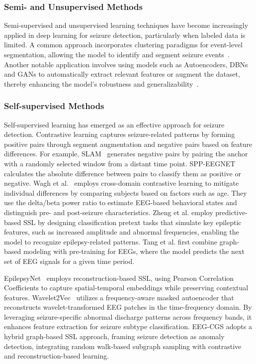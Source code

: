 \subsubsection{Semi- and Unsupervised Methods}
Semi-supervised and unsupervised learning techniques have become increasingly applied in deep learning for seizure detection, particularly when labeled data is limited. 
A common approach incorporates clustering paradigms for event-level segmentation, allowing the model to identify and segment seizure events~\cite{Zhan2020EpilepsyDetection}.
Another notable application involves using models such as Autoencoders, DBNs and GANs to automatically extract relevant features or augment the dataset, thereby enhancing the model’s robustness and generalizability~\cite{abdelhameed2018epileptic,turner2014deep,you2020unsupervised}. 


\subsubsection{Self-supervised Methods}
Self-supervised learning has emerged as an effective approach for seizure detection. 
Contrastive learning captures seizure-related patterns by forming positive pairs through segment augmentation and negative pairs based on feature differences.
For example, SLAM~\cite{XIAO2024105464} generates negative pairs by pairing the anchor with a randomly selected window from a distant time point. SPP-EEGNET~\cite{li2022spp} calculates the absolute difference between pairs to classify them as positive or negative.
Wagh et al.~\cite{wagh2021domain} employs cross-domain contrastive learning to mitigate individual differences by comparing subjects based on factors such as age. They use the delta/beta power ratio to estimate EEG-based behavioral states and distinguish pre- and post-seizure characteristics.
Zheng et al.\cite{zheng2022task} employ predictive-based SSL by designing classification pretext tasks that simulate key epileptic features, such as increased amplitude and abnormal frequencies, enabling the model to recognize epilepsy-related patterns. 
Tang et al.\cite{tang2021self} first combine graph-based modeling with pre-training for EEGs, where the model predicts the next set of EEG signals for a given time period.

EpilepsyNet~\cite{lih2023epilepsynet} employs reconstruction-based SSL, using Pearson Correlation Coefficients to capture spatial-temporal embeddings while preserving contextual features.
Wavelet2Vec~\cite{peng2023wavelet2vec} utilizes a frequency-aware masked autoencoder that reconstructs wavelet-transformed EEG patches in the time-frequency domain. By leveraging seizure-specific abnormal discharge patterns across frequency bands, it enhances feature extraction for seizure subtype classification.
EEG-CGS\cite{ho2023self} adopts a hybrid graph-based SSL approach, framing seizure detection as anomaly detection, integrating random walk-based subgraph sampling with contrastive and reconstruction-based learning.

